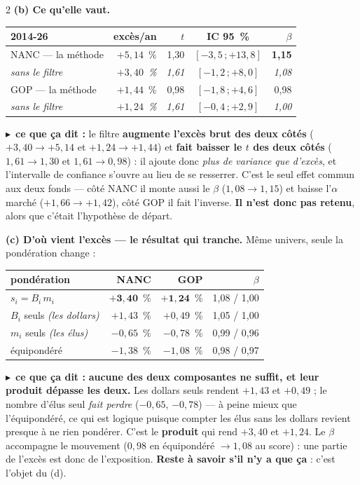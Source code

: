 \documentclass[9pt,a4paper]{extarticle}
\newcommand{\lire}[1]{{\scriptsize\color{vert}$\blacktriangleright$~\textbf{ce que ça dit :} #1}\par}
\begin{document}
\begin{multicols}{2}
\textbf{(b) Ce qu'elle vaut.}
\begin{center}\scriptsize
\begin{tabular}{@{}l r r c r@{}}
\toprule
2014-26 & excès/an & $t$ & IC 95~\% & $\beta$ \\
\midrule
NANC --- la méthode & $+5{,}14$~\% & 1,30 & $[-3{,}5\,;+13{,}8]$ & \textbf{1,15} \\
\quad \emph{sans le filtre} & \emph{$+3{,}40$~\%} & \emph{1,61} & \emph{$[-1{,}2\,;+8{,}0]$} & \emph{1,08} \\
GOP --- la méthode & $+1{,}44$~\% & 0,98 & $[-1{,}8\,;+4{,}6]$ & 0,98 \\
\quad \emph{sans le filtre} & \emph{$+1{,}24$~\%} & \emph{1,61} & \emph{$[-0{,}4\,;+2{,}9]$} & \emph{1,00} \\
\bottomrule
\end{tabular}
\end{center}
\lire{le filtre \textbf{augmente l'excès brut des deux côtés} ($+3{,}40\to+5{,}14$ et $+1{,}24\to+1{,}44$) et
\textbf{fait baisser le $t$ des deux côtés} ($1{,}61\to1{,}30$ et $1{,}61\to0{,}98$) : il ajoute donc \emph{plus
de variance que d'excès}, et l'intervalle de confiance s'ouvre au lieu de se resserrer. C'est le seul effet
commun aux deux fonds --- côté NANC il monte aussi le $\beta$ ($1{,}08\to1{,}15$) et baisse l'$\alpha$ marché
($+1{,}66\to+1{,}42$), côté GOP il fait l'inverse. \textbf{Il n'est donc pas retenu}, alors que c'était
l'hypothèse de départ.}

\textbf{(c) D'où vient l'excès --- le résultat qui tranche.} Même univers, seule la pondération change :
\begin{center}\scriptsize
\begin{tabular}{@{}l r r r@{}}
\toprule
pondération & NANC & GOP & $\beta$ \\
\midrule
$s_i=B_i\,m_i$ & $\mathbf{+3{,}40}$~\% & $\mathbf{+1{,}24}$~\% & 1,08 / 1,00 \\
$B_i$ seuls \emph{(les dollars)} & $+1{,}43$~\% & $+0{,}49$~\% & 1,05 / 1,00 \\
$m_i$ seuls \emph{(les élus)} & $-0{,}65$~\% & $-0{,}78$~\% & 0,99 / 0,96 \\
équipondéré & $-1{,}38$~\% & $-1{,}08$~\% & 0,98 / 0,97 \\
\bottomrule
\end{tabular}
\end{center}
\lire{\textbf{aucune des deux composantes ne suffit, et leur produit dépasse les deux.} Les dollars seuls
rendent $+1{,}43$ et $+0{,}49$ ; le nombre d'élus seul \emph{fait perdre} ($-0{,}65$, $-0{,}78$) --- à peine
mieux que l'équipondéré, ce qui est logique puisque compter les élus sans les dollars revient presque à ne rien
pondérer. C'est le \textbf{produit} qui rend $+3{,}40$ et $+1{,}24$. Le $\beta$ accompagne le mouvement
($0{,}98$ en équipondéré $\to 1{,}08$ au score) : une partie de l'excès est donc de l'exposition.
\textbf{Reste à savoir s'il n'y a que ça} : c'est l'objet du (d).}


\end{multicols}
\end{document}
